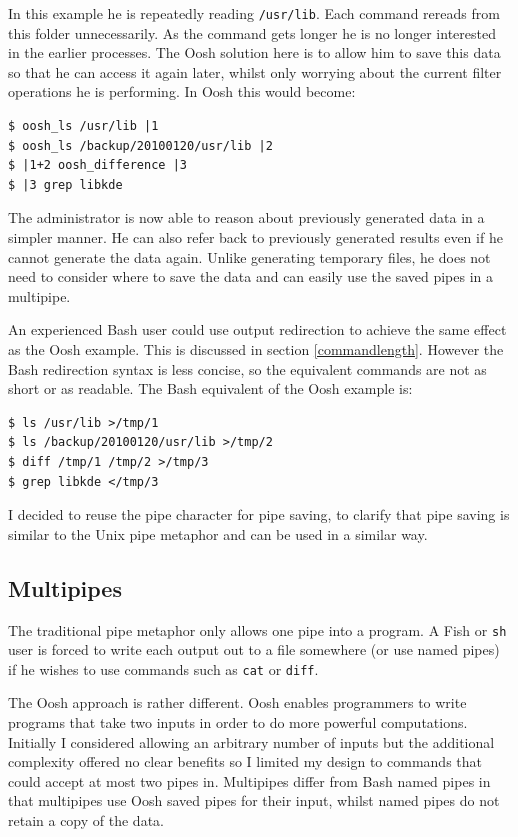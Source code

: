 \documentclass[12pt,twoside,notitlepage]{report}
\begin{document}
In this example he is repeatedly reading {\tt /usr/lib}. Each command
rereads from this folder unnecessarily. As the command gets longer he
is no longer interested in the earlier processes. The Oosh solution
here is to allow him to save this data so that he can access it again
later, whilst only worrying about the current filter operations he is
performing. In Oosh this would become:

\begin{verbatim}
$ oosh_ls /usr/lib |1
$ oosh_ls /backup/20100120/usr/lib |2
$ |1+2 oosh_difference |3
$ |3 grep libkde
\end{verbatim}

The administrator is now able to reason about previously generated data in a
simpler manner. He can also refer back to previously generated results
even if he cannot generate the data again. Unlike generating temporary
files, he does not need to consider where to save the data and can
easily use the saved pipes in a multipipe.

An experienced Bash user could use output redirection to achieve the
same effect as the Oosh example. This is discussed in section
\ref{commandlength}. However the Bash redirection syntax is less
concise, so the equivalent commands are not as short or as
readable. The Bash equivalent of the Oosh example is:

\begin{verbatim}
$ ls /usr/lib >/tmp/1
$ ls /backup/20100120/usr/lib >/tmp/2
$ diff /tmp/1 /tmp/2 >/tmp/3
$ grep libkde </tmp/3
\end{verbatim}

I decided to reuse the pipe character for pipe saving, to clarify that
pipe saving is similar to the Unix pipe metaphor and can be used in a
similar way.

\subsection{Multipipes}

The traditional pipe metaphor only allows one pipe into a program. A
Fish or {\tt sh} user is forced to write each output out to a file
somewhere (or use named pipes) if he wishes to use commands such as
{\tt cat} or {\tt diff}.

The Oosh approach is rather different. Oosh enables programmers to
write programs that take two inputs in order to do more powerful
computations. Initially I considered allowing an arbitrary number of
inputs but the additional complexity offered no clear benefits so I
limited my design to commands that could accept at most two pipes
in. Multipipes differ from Bash named pipes in that multipipes use
Oosh saved pipes for their input, whilst named pipes do not retain a
copy of the data.
\end{document}
